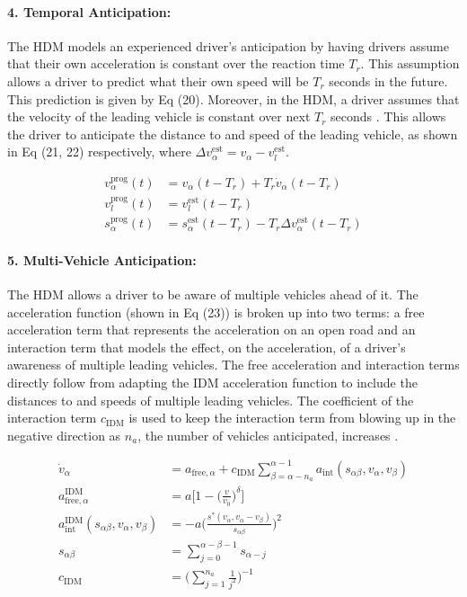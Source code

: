 \documentclass[12pt]{article}
\begin{document}
\paragraph{4. Temporal Anticipation:}
The HDM models an experienced driver's anticipation by having drivers assume that their own acceleration is constant over the reaction time $T_r$.  This assumption allows a driver to predict what their own speed will be $T_r$ seconds in the future.  This prediction is given by Eq (20).  Moreover, in the HDM, a driver assumes that the velocity of the leading vehicle is constant over next $T_r$ seconds \cite[Chapter~12]{treiber_kesting_2013}.  This allows the driver to anticipate the distance to and speed of the leading vehicle, as shown in Eq (21, 22) respectively, where $\Delta v_\alpha^\text{est}=v_\alpha-v_l^\text{est}$.
\begin{mymathbox}[ams gather, title=Temporal Anticipation Equations,colframe=blue!30!black]
  \begin{align}
  v_\alpha^{\text{prog}}(t)&=v_\alpha(t-T_r)+T_r\dot v_\alpha(t-T_r)\\
  v_l^{\text{prog}}(t)&=v_l^\text{est}(t-T_r)\\
  s_\alpha^{\text{prog}}(t)&=s_\alpha^\text{est}(t-T_r)-T_r\Delta v_\alpha^\text{est}(t-T_r)
  \end{align}
\end{mymathbox}
\paragraph{5. Multi-Vehicle Anticipation:}
The HDM allows a driver to be aware of multiple vehicles ahead of it.  The acceleration function (shown in Eq (23)) is broken up into two terms: a free acceleration term that represents the acceleration on an open road and an interaction term that models the effect, on the acceleration, of a driver's awareness of multiple leading vehicles.  The free acceleration and interaction terms directly follow from adapting the IDM acceleration function to include the distances to and speeds of multiple leading vehicles.  The coefficient of the interaction term $c_{\text{IDM}}$ is used to keep the interaction term from blowing up in the negative direction as $n_a$, the number of vehicles anticipated, increases \cite[Chapter~12]{treiber_kesting_2013}.
\begin{mymathbox}[ams gather, title=Multi-Vehicle Anticipation Equations,colframe=blue!30!black]
  \begin{align}
  \dot v_\alpha &= a_{\text{free},\alpha}+c_{\text{IDM}}\sum_{\beta=\alpha-n_a}^{\alpha-1}a_{\text{int}}(s_{\alpha\beta},v_\alpha,v_\beta)\\
  a^{\text{IDM}}_{\text{free},\alpha}&=a\Bigg[1-\bigg(\frac{v}{v_0}\bigg)^\delta\Bigg]\\
  a^{\text{IDM}}_{\text{int}}(s_{\alpha\beta},v_\alpha,v_\beta)&=-a\Bigg(\frac{s^*(v_\alpha,v_\alpha-v_\beta)}{s_{\alpha\beta}}\Bigg)^2\\
  s_{\alpha\beta}&=\sum_{j=0}^{\alpha-\beta-1}s_{\alpha-j}\\
  c_{\text{IDM}}&=\Bigg(\sum_{j=1}^{n_a}\frac{1}{j^2}\Bigg)^{-1}
  \end{align}
\end{mymathbox}
\end{document}
